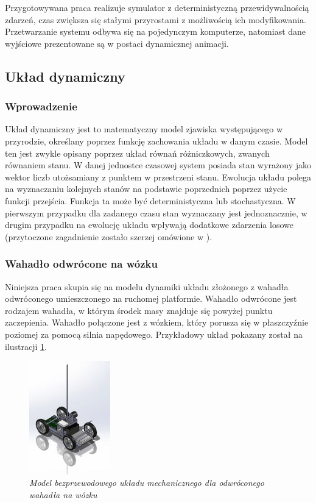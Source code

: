 \documentclass[12pt, oneside]{report}
\theoremstyle{definition}
\begin{document}
Przygotowywana praca realizuje symulator z deterministyczną przewidywalnością zdarzeń, czas zwiększa się stałymi przyrostami z możliwością ich modyfikowania. Przetwarzanie systemu odbywa się na pojedynczym komputerze, natomiast dane wyjściowe prezentowane są w postaci dynamicznej animacji.

\subsection{Układ dynamiczny}
\subsubsection{Wprowadzenie}
Układ dynamiczny jest to matematyczny model zjawiska występującego w przyrodzie, określany poprzez funkcję zachowania układu w danym czasie. Model ten jest zwykle opisany poprzez układ równań różniczkowych, zwanych równaniem stanu. W danej jednostce czasowej system posiada stan wyrażony jako wektor liczb utożsamiany z punktem w przestrzeni stanu. Ewolucja układu polega na wyznaczaniu kolejnych stanów na podstawie poprzednich poprzez użycie funkcji przejścia. Funkcja ta może być deterministyczna lub stochastyczna. W pierwszym przypadku dla zadanego czasu stan wyznaczany jest jednoznacznie, w drugim przypadku na ewolucję układu wpływają dodatkowe zdarzenia losowe (przytoczone zagadnienie zostało szerzej omówione w \cite{MarciniakDynamicSystems}).

\subsubsection{Wahadło odwrócone na wózku}
\label{SubsectionPendulumIntro}
Niniejsza praca skupia się na modelu dynamiki układu złożonego z wahadła odwróconego umieszczonego na ruchomej platformie. Wahadło odwrócone jest rodzajem wahadła, w którym środek masy znajduje się powyżej punktu zaczepienia. Wahadło połączone jest z wózkiem, który porusza się w płaszczyźnie poziomej za pomocą silnia napędowego. Przykładowy układ pokazany został na ilustracji \ref{SystemModelImage}.

\begin{figure}[H]
	\centering
		\includegraphics[width = 100pt]{SystemModel} 
		\caption{\textit{Model bezprzewodowego układu mechanicznego dla odwróconego wahadła na wózku \cite{SystemModel}}}
		\label{SystemModelImage}
\end{figure}
\end{document}
